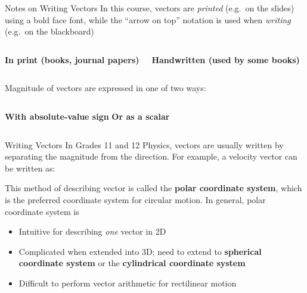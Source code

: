 \documentclass[12pt,compress,aspectratio=169]{beamer}
\newcommand{\mb}[1]{\ensuremath\mathbf{#1}}
\newcommand{\eq}[2]{\vspace{#1}{\Large\begin{displaymath}#2\end{displaymath}}}
\begin{document}
\begin{frame}{Notes on  Writing Vectors}
  In this course, vectors are \emph{printed} (e.g.\ on the slides) using a bold
  face font, while the ``arrow on top'' notation is used when \emph{writing}
  (e.g.\ on the blackboard)
  \vspace{.1in}
  \begin{columns}
    \textbf{In print (books, journal papers)}
    \vspace{-.2in}{\LARGE
      \begin{displaymath}
        \mb{v}\quad\mb{F}_g\quad\mb{p}\quad\mb{I}
      \end{displaymath}
    }
    
    \textbf{Handwritten (used by some books)}
  \end{columns}
  Magnitude of vectors are expressed in one of two ways:
  \vspace{.1in}
  \begin{columns}
    \textbf{With absolute-value sign}
    \vspace{-.2in}{\LARGE
      \begin{displaymath}
        |\mb{v}|\quad|\mb{F}_g|\quad|\mb{p}|\quad|\mb{I}|
      \end{displaymath}
    }
    \textbf{Or as a scalar}
      \vspace{-.2in}{\LARGE
        \begin{displaymath}
          v\quad F_g\quad p \quad I
        \end{displaymath}
      }
  \end{columns}
\end{frame}


\begin{frame}{Writing Vectors}
  In Grades 11 and 12 Physics, vectors are usually written by separating the
  magnitude from the direction. For example, a velocity vector can be written
  as:
  
  \eq{-.4in}{
    \mb{v}=\SI{4.5}{\metre\per\second}\text{ [N \ang{55} E]}
  }
  
  \vspace{-.25in}This method of describing vector is called the
  \textbf{polar coordinate system}, which is the preferred coordinate system
  for circular motion. In general, polar coordinate system is
  \begin{itemize}
  \item Intuitive for describing \emph{one} vector in 2D
  \item Complicated when extended into 3D; need to extend to
    \textbf{spherical coordinate system} or the
    \textbf{cylindrical coordinate system}
  \item Difficult to perform vector arithmetic for rectilinear motion
  \end{itemize}
\end{frame}
\end{document}
